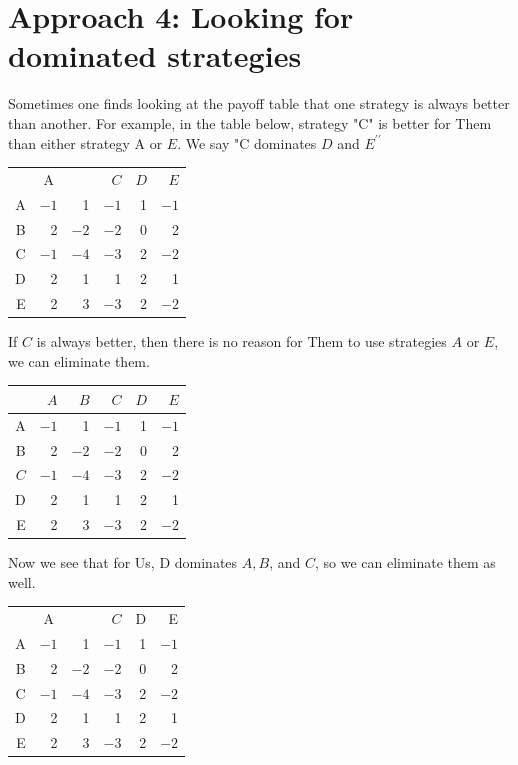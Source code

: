 \documentclass[10pt]{article}
\begin{document}
\section{Approach 4: Looking for dominated strategies}
Sometimes one finds looking at the payoff table that one strategy is always better than another. For example, in the table below, strategy "C" is better for Them than either strategy A or $E$. We say "C dominates $D$ and $E^{\prime \prime}$

\begin{tabular}{r|r|r|r|r|r|}
 & \multicolumn{1}{c}{A} &  & $C$ & $D$ & $E$ \\
\cline { 2 - 6 }
A & $-1$ & 1 & $-1$ & 1 & $-1$ \\
\cline { 2 - 5 }
B & 2 & $-2$ & $-2$ & 0 & 2 \\
\cline { 2 - 5 }
C & $-1$ & $-4$ & $-3$ & 2 & $-2$ \\
\cline { 2 - 5 }
D & 2 & 1 & 1 & 2 & 1 \\
\cline { 2 - 6 }
E & 2 & 3 & $-3$ & 2 & $-2$ \\
\hline
\end{tabular}

If $C$ is always better, then there is no reason for Them to use strategies $A$ or $E$, we can eliminate them.

\begin{tabular}{r|r|r|r|r|r|}
\multicolumn{1}{r}{} & $A$ & $B$ & $C$ & $D$ & $E$ \\
\hline
A & $-1$ & 1 & $-1$ & 1 & $-1$ \\
\hline
B & 2 & $-2$ & $-2$ & 0 & 2 \\
\cline { 2 - 6 }
$C$ & $-1$ & $-4$ & $-3$ & 2 & $-2$ \\
\cline { 2 - 6 }
D & 2 & 1 & 1 & 2 & 1 \\
\cline { 2 - 6 }
E & 2 & 3 & $-3$ & 2 & $-2$ \\
\hline
\end{tabular}

Now we see that for Us, D dominates $A, B$, and $C$, so we can eliminate them as well.

\begin{tabular}{rr|r|r|r|r|}
 & \multicolumn{1}{c}{A} &  & $C$ & D & E \\
\cline { 2 - 6 }
A & $-1$ & 1 & $-1$ & 1 & $-1$ \\
\cline { 2 - 6 }
B & 2 & $-2$ & $-2$ & 0 & 2 \\
\hline
C & $-1$ & $-4$ & $-3$ & 2 & $-2$ \\
\cline { 2 - 6 }
D & 2 & 1 & 1 & 2 & 1 \\
\cline { 2 - 6 }
E & 2 & 3 & $-3$ & 2 & $-2$ \\
\cline { 2 - 6 }
\end{tabular}
\end{document}
